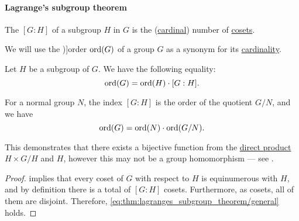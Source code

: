 \paragraph{Lagrange's subgroup theorem}

\begin{definition}\label{def:subgroup_index}
  The  \( [G : H] \) of a subgroup \( H \) in \( G \) is the (\hyperref[def:cardinal]{cardinal}) number of \hyperref[rem:subgroup_cosets]{cosets}.
\end{definition}

\medskip

\begin{definition}\label{def:group_order}
  We will use the \term[ru=порядок (\cite[81]{Тыртышников2017ОсновыАлгебры})]{order} \( \operatorname{ord}(G) \) of a group \( G \) as a synonym for its \hyperref[thm:cardinality_existence]{cardinality}.
\end{definition}

\begin{theorem}\label{thm:lagranges_subgroup_theorem}
  Let \( H \) be a subgroup of \( G \). We have the following equality:
  \begin{equation}\label{eq:thm:lagranges_subgroup_theorem/general}
    \operatorname{ord}(G) = \operatorname{ord}(H) \cdot [G : H].
  \end{equation}

  For a normal group \( N \), the index \( [G : H] \) is the order of the quotient \( G / N \), and we have
  \begin{equation}\label{eq:thm:lagranges_subgroup_theorem/normal}
    \operatorname{ord}(G) = \operatorname{ord}(N) \cdot \operatorname{ord}(G / N).
  \end{equation}
\end{theorem}
\begin{comments}
  \item This demonstrates that there exists a bijective function from the \hyperref[def:first_order_direct_product]{direct product} \( H \times G / H \) and \( H \), however this may not be a group homomorphism --- see .
\end{comments}
\begin{proof}
   implies that every coset of \( G \) with respect to \( H \) is equinumerous with \( H \), and by definition there is a total of \( [G : H] \) cosets. Furthermore, as cosets, all of them are disjoint. Therefore, \eqref{eq:thm:lagranges_subgroup_theorem/general} holds.
\end{proof}

